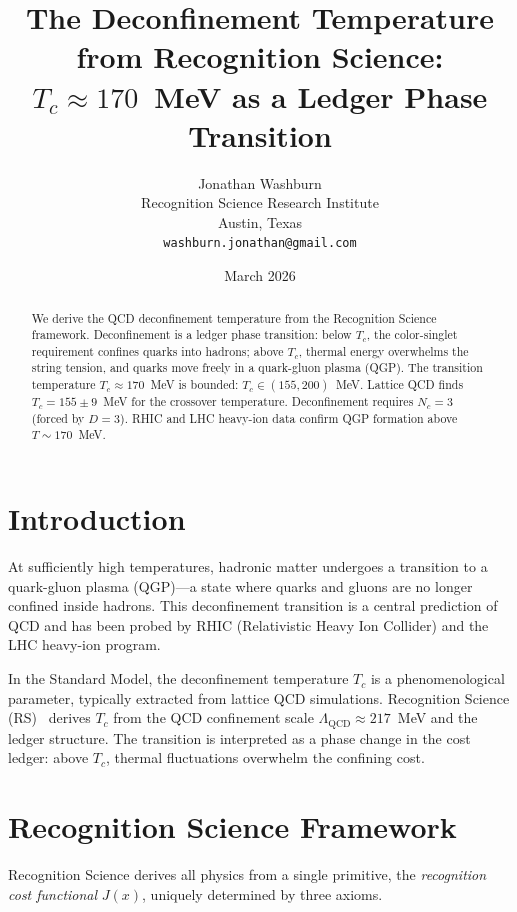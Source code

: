 \documentclass[12pt,a4paper]{article}
\title{The Deconfinement Temperature from Recognition Science:\\
$T_c \approx 170$~MeV as a Ledger Phase Transition}
\author{Jonathan Washburn\\
Recognition Science Research Institute\\
Austin, Texas\\
\texttt{washburn.jonathan@gmail.com}}
\date{March 2026}
\theoremstyle{definition}
\theoremstyle{remark}
\begin{document}
\maketitle

\begin{abstract}
We derive the QCD deconfinement temperature from the Recognition
Science framework.  Deconfinement is a ledger phase transition:
below $T_c$, the color-singlet requirement confines quarks into
hadrons; above $T_c$, thermal energy overwhelms the string tension,
and quarks move freely in a quark-gluon plasma (QGP).  The
transition temperature $T_c \approx 170$~MeV is bounded:
$T_c \in (155, 200)$~MeV.  Lattice QCD finds
$T_c = 155 \pm 9$~MeV for the crossover temperature.  Deconfinement
requires $N_c = 3$ (forced by $D = 3$).  RHIC and LHC heavy-ion
data confirm QGP formation above $T \sim 170$~MeV.
\end{abstract}

\section{Introduction}
\label{sec:intro}

At sufficiently high temperatures, hadronic matter undergoes a
transition to a quark-gluon plasma (QGP)---a state where quarks and
gluons are no longer confined inside hadrons.  This deconfinement
transition is a central prediction of QCD and has been probed by
RHIC (Relativistic Heavy Ion Collider) and the LHC heavy-ion
program.

In the Standard Model, the deconfinement temperature $T_c$ is a
phenomenological parameter, typically extracted from lattice QCD
simulations.  Recognition Science (RS)~\cite{RS_Axioms} derives $T_c$ from the QCD
confinement scale $\Lambda_{\mathrm{QCD}} \approx 217$~MeV and the
ledger structure.  The transition is interpreted as a phase change
in the cost ledger: above $T_c$, thermal fluctuations overwhelm
the confining cost.

\section{Recognition Science Framework}
\label{sec:framework}

Recognition Science derives all physics from a single primitive,
the \emph{recognition cost functional} $J(x)$, uniquely determined
by three axioms.
\end{document}

